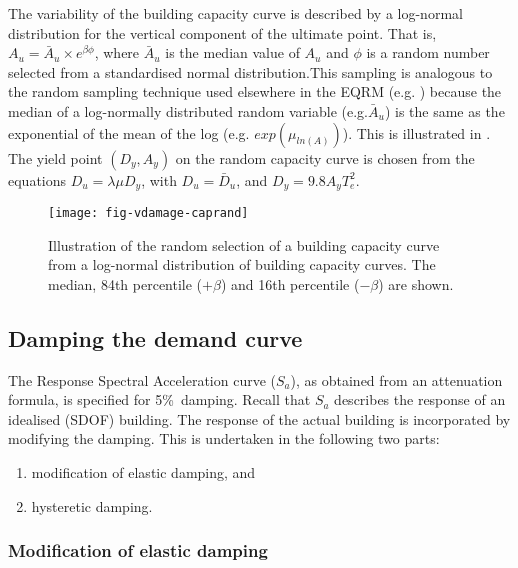 The variability of the building capacity curve is described by a log-normal distribution for the vertical
component of the ultimate point. That is, $A_u=\bar A_u\times
e^{\beta\phi}$, where $\bar A_u$ is the median value of $A_u$ and
$\phi$ is a random number selected from a standardised normal
distribution.This sampling is
analogous to the random sampling technique used elsewhere in the
EQRM (e.g. ) because the median
 of a log-normally distributed random variable (e.g.$\bar A_u$) is the
 same as the exponential of the mean of the log (e.g. $exp(\mu_{ln(A)})$).
 This is illustrated in
. The yield point $(D_y, A_y)$
on the random capacity curve is chosen from
the equations $D_u=\lambda\mu D_y$, with $D_u=\bar D_u$, and $D_y
= 9.8A_yT_e^2$.

\begin{figure}[htp]
\centering
{}
\texttt{[image: fig-vdamage-caprand]}
\caption{Illustration of the random selection of a building
capacity curve from a log-normal
distribution of building capacity curves.
The median, 84th percentile ($+\beta$) and 16th percentile
($-\beta$) are shown.} \label{fig:vdamage-capcurve-random}
\end{figure}




\subsection{Damping the demand curve}
\label{subsec:v-dam-damping}

The Response Spectral Acceleration curve ($S_a$), as obtained from
an attenuation formula, is specified for 5\%\ damping. Recall that
$S_a$ describes the response of an idealised (SDOF) building. The
response of the actual building is incorporated by modifying the
damping. This is undertaken in the following two parts:
\begin{enumerate}
\item modification of elastic damping, and \item hysteretic
damping.
\end{enumerate}


\subsubsection{Modification of elastic damping}
\label{sec:damage-elasticdamping}

